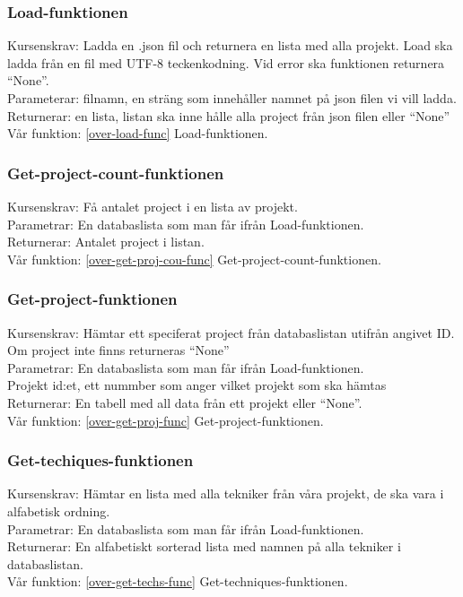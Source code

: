 \documentclass{TDP003mall}
\begin{document}
\subsubsection{Load-funktionen}
Kursenskrav: Ladda en .json fil och returnera en lista med alla projekt. Load ska ladda från en fil med UTF-8 teckenkodning. Vid error ska funktionen returnera ``None''.\\
\indent Parameterar: filnamn, en sträng som innehåller namnet på json filen vi vill ladda.\\
\indent Returnerar: en lista, listan ska inne hålle alla project från json filen eller ``None''\\
Vår funktion: \ref{over-load-func} Load-funktionen.

\subsubsection{Get-project-count-funktionen}
Kursenskrav: Få antalet project i en lista av projekt.\\
\indent Parametrar: En databaslista som man får ifrån Load-funktionen.\\
\indent Returnerar: Antalet project i listan.\\
Vår funktion: \ref{over-get-proj-cou-func} Get-project-count-funktionen.

\subsubsection{Get-project-funktionen}
Kursenskrav: Hämtar ett speciferat project från databaslistan utifrån angivet ID. Om project inte finns returneras ``None''\\
\indent Parametrar: En databaslista som man får ifrån Load-funktionen.\\
\indent \indent Projekt id:et, ett nummber som anger vilket projekt som ska hämtas\\
\indent Returnerar: En tabell med all data från ett projekt eller ``None''.\\
Vår funktion: \ref{over-get-proj-func} Get-project-funktionen.

\subsubsection{Get-techiques-funktionen}
Kursenskrav: Hämtar en lista med alla tekniker från våra projekt, de ska vara i alfabetisk ordning.\\
\indent Parametrar: En databaslista som man får ifrån Load-funktionen.\\
\indent Returnerar: En alfabetiskt sorterad lista med namnen på alla tekniker i databaslistan.\\
Vår funktion: \ref{over-get-techs-func} Get-techniques-funktionen.
\end{document}
